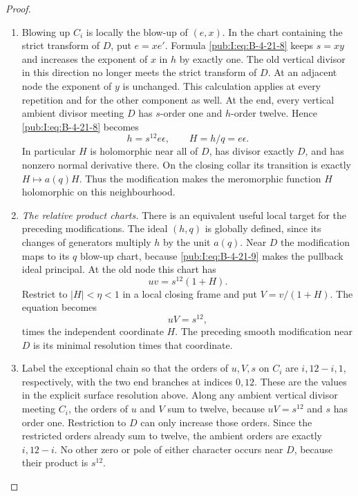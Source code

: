 \begin{proof}
\begin{enumerate}[label=\arabic*.,leftmargin=*]
\item Blowing up $C_i$ is locally the blow-up of $(e,x)$.
In the chart containing the strict transform of $D$, put
$e=xe'$.  Formula \eqref{pub:I:eq:B-4-21-8} keeps $s=xy$ and increases
the exponent of $x$ in $h$ by exactly one.  The old vertical
divisor in this direction no longer meets the strict transform
of $D$.  At an adjacent node the exponent of $y$ is unchanged.
This calculation applies at every repetition and for the
other component as well.  At the end, every vertical ambient
divisor meeting $D$ has $s$-order one and $h$-order twelve.
Hence \eqref{pub:I:eq:B-4-21-8} becomes
\begin{equation}
 h=s^{12}e\epsilon,
 \qquad H=h/q=e\epsilon.
\label{pub:I:eq:B-4-21-9}
\end{equation}
In particular $H$ is holomorphic near all of $D$, has divisor
exactly $D$, and has nonzero normal derivative there.  On the
closing collar its transition is exactly $H\mapsto a(q)H$.
Thus the modification makes the meromorphic function $H$
holomorphic on this neighbourhood.

\item \emph{The relative product charts.}
There is an equivalent useful local target for the preceding
modifications.  The ideal $(h,q)$ is globally defined, since
its changes of generators multiply $h$ by the unit $a(q)$.
Near $D$ the modification maps to its $q$ blow-up chart,
because \eqref{pub:I:eq:B-4-21-9} makes the pullback ideal principal.
At the old node this chart has
\[
 uv=s^{12}(1+H).
\]
Restrict to $|H|<\eta<1$ in a local closing frame and put
$V=v/(1+H)$.  The equation becomes
\[
 uV=s^{12},
\]
times the independent coordinate $H$.
The preceding smooth modification near $D$ is its minimal
resolution times that coordinate.  

\item Label the exceptional chain so that the orders of $u,V,s$
on $C_i$ are $i,12-i,1$, respectively, with the two end
branches at indices $0,12$.  These are the values in the
explicit surface resolution above.  Along any ambient vertical
divisor meeting $C_i$, the orders of $u$ and $V$ sum to twelve,
because $uV=s^{12}$ and $s$ has order one.  Restriction to
$D$ can only increase those orders.  Since the restricted
orders already sum to twelve, the ambient orders are exactly
$i,12-i$.  No other zero or pole of either character occurs
near $D$, because their product is $s^{12}$.


\end{enumerate}
\end{proof}
